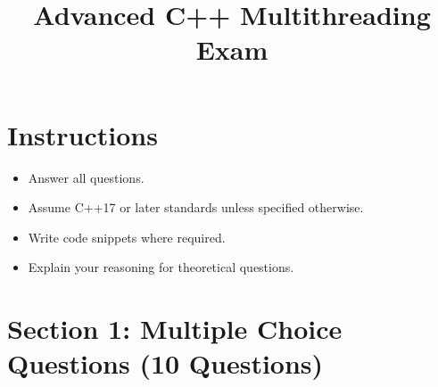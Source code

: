 \documentclass[12pt]{article}
\title{Advanced C++ Multithreading Exam}
\author{}
\date{}
\begin{document}
\maketitle

\section*{Instructions}
\begin{itemize}
    \item Answer all questions.
    \item Assume C++17 or later standards unless specified otherwise.
    \item Write code snippets where required.
    \item Explain your reasoning for theoretical questions.
\end{itemize}

\section*{Section 1: Multiple Choice Questions (10 Questions)}
\end{document}
